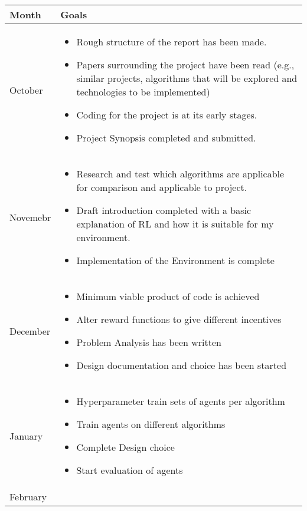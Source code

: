 \documentclass{surrey_disso_style}
\begin{document}
\begin{center}
\begin{tabular}{|p{1.6cm}|p{13cm}|}
   \hline
   \textbf{Month} & \textbf{Goals}\\
   \hline
   October & \begin{itemize}
      \item Rough structure of the report has been made. 
      \item Papers surrounding the project have been read (e.g., similar projects, algorithms that will be explored and technologies to be implemented)
      \item Coding for the project is at its early stages.
      \item Project Synopsis completed and submitted.
   \end{itemize} \\
   \hline
   Novemebr & 
      \begin{itemize}
      \item Research and test which algorithms are applicable for comparison and applicable to project.
      \item Draft introduction completed with a basic explanation of RL and how it is suitable for my environment.
      \item Implementation of the Environment is complete
      \end{itemize}\\
   \hline
   December & \begin{itemize}
      \item Minimum viable product of code is achieved
      \item Alter reward functions to give different incentives
      \item Problem Analysis has been written
      \item Design documentation and choice has been started
   \end{itemize}\\
   \hline
   January & \begin{itemize}
      \item Hyperparameter train sets of agents per algorithm
      \item Train agents on different algorithms 
      \item Complete Design choice 
      \item Start evaluation of agents
   \end{itemize}\\
   \hline
   February & \begin{itemize}

\end{itemize}
\end{tabular}
\end{center}
\end{document}
